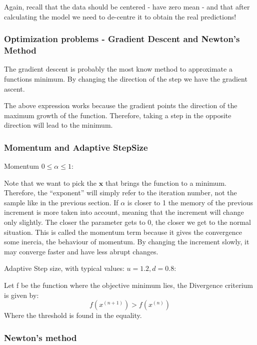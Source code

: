 Again, recall that the data should be centered - have zero mean - and that after calculating the model we need to de-centre it to obtain the real predictions!

\subsubsection{Optimization problems - Gradient Descent and Newton's Method}

The gradient descent is probably the most know method to approximate a functions minimum. By changing the direction of the step we have the gradient ascent. 


The above expression works because the gradient points the direction of the maximum growth of the function. Therefore, taking a step in the opposite direction will lead to the minimum.

\subsubsection*{Momentum and Adaptive StepSize}
Momentum $0 \leq \alpha \leq 1$:


Note that we want to pick the $\mathbf{x}$ that brings the function to a minimum. Therefore, the ``exponent'' will simply refer to the iteration number, not the sample like in the previous section.
If $\alpha$ is closer to 1 the memory of the previous increment is more taken into account, meaning that the increment will change only slightly. The closer the parameter gets to 0, the closer we get to the normal situation. This is called the momentum term because it gives the convergence some inercia, the behaviour of momentum. By changing the increment slowly, it may converge faster and have less abrupt changes.


Adaptive Step size, with typical values: $u = 1.2, d = 0.8$:


Let f be the function where the objective minimum lies, the Divergence criterium is given by:
\begin{equation}
    f(x^{(n+1)}) > f(x^{(n)})
\end{equation}
Where the threshold is found in the equality.

\subsubsection*{Newton's method}

